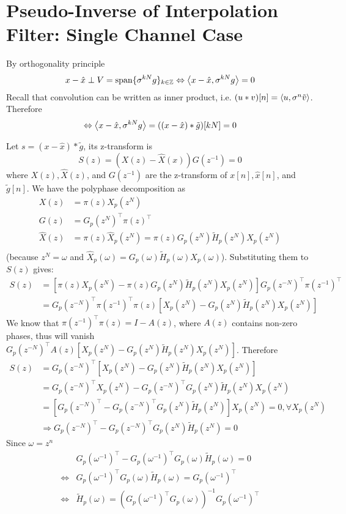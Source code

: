 \section{Pseudo-Inverse of Interpolation Filter: Single Channel Case}\label{sec:p4}

By orthogonality principle
\[x - \hat{x} \perp V = \mathrm{span}\{\sigma^{kN}g\}_{k \in \mathbb{Z}} \Leftrightarrow \left\langle x-\hat{x}, \sigma^{kN}g \right\rangle = 0 \]
Recall that convolution can be written as inner product, i.e. $(u*v)[n] = \left\langle u, \sigma^n \tilde{v} \right\rangle$. Therefore
\[\Leftrightarrow \left\langle x-\hat{x}, \sigma^{kN}g \right\rangle = ((x-\hat{x})*\tilde{g})[kN] = 0\]

Let $s = (x-\hat{x})*\tilde{g}$, its z-transform is
\[S(z) = (X(z) - \hat{X}(x))G(z^{-1}) = 0\]
where $X(z), \hat{X}(z)$, and $G(z^{-1})$ are the z-transform of $x[n], \hat{x}[n]$, and $\tilde{g}[n]$. We have the polyphase decomposition as
\begin{align*}
	X(z) &= \pi(z) X_p(z^N) \\
	G(z) &= G_p(z^N)^\top \pi(z)^\top \\
	\hat{X}(z) &= \pi(z) \hat{X}_p(z^N) = \pi(z) G_p(z^N)\tilde{H}_p(z^N)X_p(z^N)\\
\end{align*}
(because $z^N = \omega$ and $\hat{X}_p(\omega) = G_p(\omega)\tilde{H}_p(\omega)X_p(\omega)$). Substituting them to $S(z)$ gives:
\begin{align*}
	S(z)
	&= \left[\pi(z)X_p(z^N) - \pi(z) G_p(z^N)\tilde{H}_p(z^N)X_p(z^N)\right]G_p(z^{-N})^\top \pi(z^{-1})^\top \\
	&= G_p(z^{-N})^\top \pi(z^{-1})^\top \pi(z)\left[X_p(z^N) -  G_p(z^N)\tilde{H}_p(z^N)X_p(z^N)\right]
\end{align*}
We know that $\pi(z^{-1})^\top \pi(z) = I - A(z)$, where $A(z)$ contains non-zero phases, thus will vanish $G_p(z^{-N})^\top A(z) \left[X_p(z^N) -  G_p(z^N)\tilde{H}_p(z^N)X_p(z^N)\right]$. Therefore 
\begin{align*}
	S(z)
	&= G_p(z^{-N})^\top \left[X_p(z^N) -  G_p(z^N)\tilde{H}_p(z^N)X_p(z^N)\right] \\
	&= G_p(z^{-N})^\top X_p(z^N) - G_p(z^{-N})^\top G_p(z^N)\tilde{H}_p(z^N)X_p(z^N) \\
	&= \left[ G_p(z^{-N})^\top - G_p(z^{-N})^\top G_p(z^N)\tilde{H}_p(z^N) \right] X_p(z^N) = 0, \forall X_p(z^N)\\
	&\Rightarrow G_p(z^{-N})^\top - G_p(z^{-N})^\top G_p(z^N)\tilde{H}_p(z^N) = 0
\end{align*}
Since $\omega = z^n$
\begin{align*}
	&G_p(\omega^{-1})^\top - G_p(\omega^{-1})^\top G_p(\omega)\tilde{H}_p(\omega) = 0\\
	\Leftrightarrow & G_p(\omega^{-1})^\top G_p(\omega)\tilde{H}_p(\omega) = G_p(\omega^{-1})^\top \\
	\Leftrightarrow &\tilde{H}_p(\omega) = \left(G_p(\omega^{-1})^\top G_p(\omega)\right)^{-1} G_p(\omega^{-1})^\top
\end{align*}
